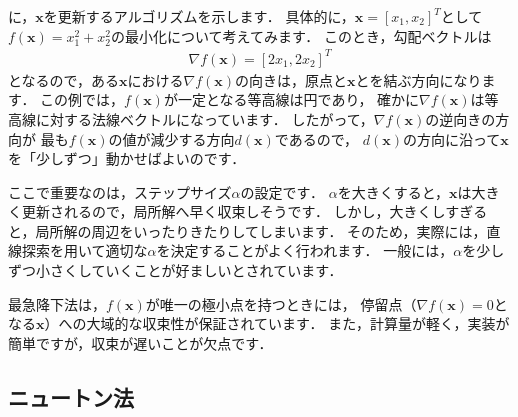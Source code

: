 に，$\bm{x}$を更新するアルゴリズムを示します．
具体的に，$\bm{x} = [x_1,x_2]^T$として$f(\bm{x}) = x_1^2 + x_2^2$の最小化について考えてみます．
このとき，勾配ベクトルは
\begin{align}
 \nabla f(\bm{x}) = [2 x_1, 2 x_2]^T
\end{align}
となるので，ある$\bm{x}$における$\nabla f(\bm{x})$の向きは，原点と$\bm{x}$とを結ぶ方向になります．
この例では，$f(\bm{x})$が一定となる等高線は円であり，
確かに$\nabla f(\bm{x})$は等高線に対する法線ベクトルになっています．
したがって，$\nabla f(\bm{x})$の逆向きの方向が
最も$f(\bm{x})$の値が減少する方向$d(\bm{x})$であるので，
$d(\bm{x})$の方向に沿って$\bm{x}$を「少しずつ」動かせばよいのです．

ここで重要なのは，ステップサイズ$\alpha$の設定です．
$\alpha$を大きくすると，$\bm{x}$は大きく更新されるので，局所解へ早く収束しそうです．
しかし，大きくしすぎると，局所解の周辺をいったりきたりしてしまいます．
そのため，実際には，直線探索を用いて適切な$\alpha$を決定することがよく行われます．
一般には，$\alpha$を少しずつ小さくしていくことが好ましいとされています．

最急降下法は，$f(\bm{x})$が唯一の極小点を持つときには，
停留点（$\nabla f(\bm{x}) = 0$となる$\bm{x}$）への大域的な収束性が保証されています．
また，計算量が軽く，実装が簡単ですが，収束が遅いことが欠点です．

\subsection{ニュートン法}
\label{sec:newton}

